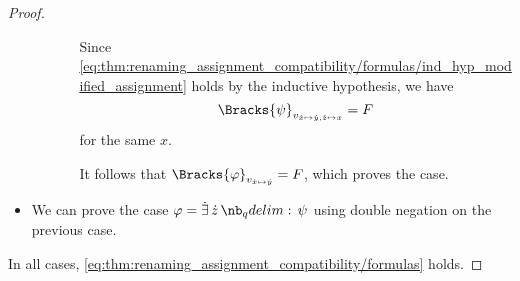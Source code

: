 \begin{proof}
\begin{itemize}
\begin{itemize}
\begin{itemize}
        Since \eqref{eq:thm:renaming_assignment_compatibility/formulas/ind_hyp_modified_assignment} holds by the inductive hypothesis, we have
        \begin{equation*}
          \Bracks{\psi}_{v_{\synx \mapsto \syny, \synz \mapsto x}} = F
        \end{equation*}
        for the same \( x \).

        It follows that \( \Bracks{\varphi}_{v_{\synx \mapsto \syny}} = F \), which proves the case.
      \end{itemize}
    \end{itemize}

    \item We can prove the case \( \varphi = \qexists \synz \psi \) using double negation on the previous case.
  \end{itemize}

  In all cases, \eqref{eq:thm:renaming_assignment_compatibility/formulas} holds.
\end{proof}

